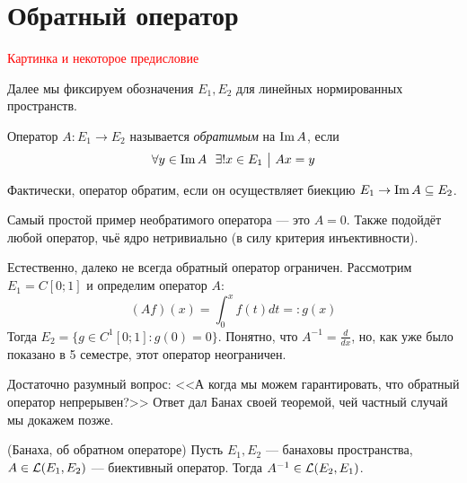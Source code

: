 \section{Обратный оператор}

\textcolor{red}{Картинка и некоторое предисловие}

\begin{note}
	Далее мы фиксируем обозначения $E_1, E_2$ для линейных нормированных пространств.
\end{note}

\begin{definition}
	Оператор $A \colon E_1 \to E_2$ называется \textit{обратимым} на $\operatorname{Im} A$, если
	\[
		\forall y \in \im A\ \ \exists ! x \in E_1 \such Ax = y
	\]
\end{definition}

\begin{anote}
	Фактически, оператор обратим, если он осуществляет биекцию $E_1 \to \operatorname{Im} A \subseteq E_2$.
\end{anote}

\begin{example}
	Самый простой пример необратимого оператора --- это $A = 0$. Также подойдёт любой оператор, чьё ядро нетривиально (в силу критерия инъективности).
\end{example}

\begin{example}
	Естественно, далеко не всегда обратный оператор ограничен. Рассмотрим $E_1 = C[0; 1]$ и определим оператор $A$:
	\[
		(Af)(x) = \int_0^x f(t)dt =: g(x)
	\]
	Тогда $E_2 = \{g \in C^1[0; 1] \colon g(0) = 0\}$. Понятно, что $A^{-1} = \frac{d}{dx}$, но, как уже было показано в 5 семестре, этот оператор неограничен.
\end{example}

\begin{note}
	Достаточно разумный вопрос: <<А когда мы можем гарантировать, что обратный оператор непрерывен?>> Ответ дал Банах своей теоремой, чей частный случай мы докажем позже.
\end{note}

\begin{theorem} (Банаха, об обратном операторе)
	Пусть $E_1, E_2$ --- банаховы пространства, $A \in \mathcal{L}(E_1, E_2)$ --- биективный оператор. Тогда $A^{-1} \in \mathcal{L}(E_2, E_1)$.
\end{theorem}